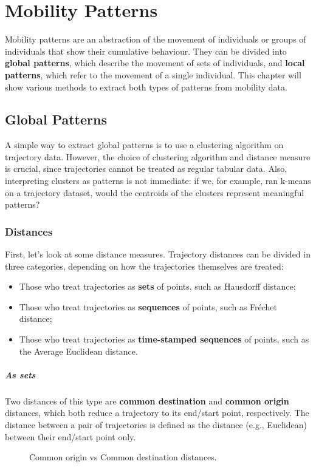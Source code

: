 \chapter{Mobility Patterns}

Mobility patterns are an abstraction of the movement of individuals or groups of individuals that show their cumulative behaviour. They can be divided into \textbf{global patterns}, which describe the movement of sets of individuals, and \textbf{local patterns}, which refer to the movement of a single individual. This chapter will show various methods to extract both types of patterns from mobility data.

\section{Global Patterns}

A simple way to extract global patterns is to use a clustering algorithm on trajectory data. However, the choice of clustering algorithm and distance measure is crucial, since trajectories cannot be treated as regular tabular data. Also, interpreting clusters as patterns is not immediate: if we, for example, ran k-means on a trajectory dataset, would the centroids of the clusters represent meaningful patterns?

\subsection{Distances}
First, let's look at some distance measures. Trajectory distances can be divided in three categories, depending on how the trajectories themselves are treated:
\begin{itemize}
    \item Those who treat trajectories as \textbf{sets} of points, such as Hausdorff distance;
    \item Those who treat trajectories as \textbf{sequences} of points, such as Fréchet distance;
    \item Those who treat trajectories as \textbf{time-stamped sequences} of points, such as the Average Euclidean distance.
\end{itemize}

\paragraph{As sets} 
Two distances of this type are \textbf{common destination} and \textbf{common origin} distances, which both reduce a trajectory to its end/start point, respectively. The distance between a pair of trajectories is defined as the distance (e.g., Euclidean) between their end/start point only.
\begin{figure}[h]
    \vspace{10pt}
    \centering
    
    \caption{Common origin vs Common destination distances.}
\end{figure}

